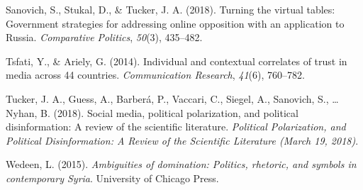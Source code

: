 \documentclass[
  english,
  man]{apa6}
\begin{document}
\leavevmode\hypertarget{ref-sanovichTurningVirtualTables2018}{}%
Sanovich, S., Stukal, D., \& Tucker, J. A. (2018). Turning the virtual tables: Government strategies for addressing online opposition with an application to Russia. \emph{Comparative Politics}, \emph{50}(3), 435--482.

\leavevmode\hypertarget{ref-tsfatiIndividualContextualCorrelates2014}{}%
Tsfati, Y., \& Ariely, G. (2014). Individual and contextual correlates of trust in media across 44 countries. \emph{Communication Research}, \emph{41}(6), 760--782.

\leavevmode\hypertarget{ref-tuckerSocialMediaPolitical2018}{}%
Tucker, J. A., Guess, A., Barberá, P., Vaccari, C., Siegel, A., Sanovich, S., \ldots{} Nyhan, B. (2018). Social media, political polarization, and political disinformation: A review of the scientific literature. \emph{Political Polarization, and Political Disinformation: A Review of the Scientific Literature (March 19, 2018)}.

\leavevmode\hypertarget{ref-wedeenAmbiguitiesDominationPolitics2015}{}%
Wedeen, L. (2015). \emph{Ambiguities of domination: Politics, rhetoric, and symbols in contemporary Syria}. University of Chicago Press.

\endgroup
\end{document}

